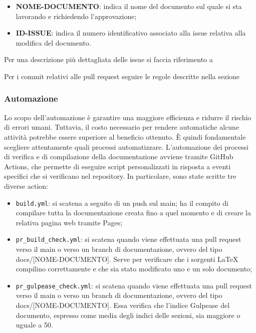 \begin{itemize}
      \item \textbf{NOME-DOCUMENTO}: indica il nome del documento sul quale si sta lavorando e richiedendo l'approvazione;
      \item \textbf{ID-ISSUE}: indica il numero identificativo associato alla issue relativa alla modifica del documento.
\end{itemize}

Per una descrizione più dettagliata delle issue si faccia riferimento a

Per i commit relativi alle pull request seguire le regole descritte nella
sezione 

\subsubsection{Automazione}\label{inf:automaz}
Lo scopo dell'automazione è garantire una maggiore efficienza e ridurre il
rischio di errori umani. Tuttavia, il costo necessario per rendere automatiche
alcune attività potrebbe essere superiore al beneficio ottenuto. È quindi
fondamentale scegliere attentamente quali processi automatizzare.
L'automazione dei processi di verifica e di compilazione della documentazione
avviene tramite GitHub Actions, che permette di eseguire script personalizzati
in risposta a eventi specifici che si verificano nel repository. In
particolare, sono state scritte tre diverse action:
\begin{itemize}
      \item \texttt{build.yml}: si scatena a seguito di un push sul main; ha il compito di compilare
            tutta la documentazione creata fino a quel momento e di creare la relativa pagina web tramite Pages;
      \item \texttt{pr\_build\_check.yml}: si scatena quando viene effettuata una pull request verso il main o verso
            un branch di documentazione, ovvero del tipo docs/[NOME-DOCUMENTO]. Serve per verificare che
            i sorgenti LaTeX compilino correttamente e che sia stato modificato uno e un solo documento;
      \item \texttt{pr\_gulpease\_check.yml}: si scatena quando viene effettuata una pull request verso il main o verso
            un branch di documentazione, ovvero del tipo docs/[NOME-DOCUMENTO]. Essa verifica che
            l'indice Gulpease del documento, espresso come media degli indici delle sezioni, sia maggiore o uguale a 50.
\end{itemize}
